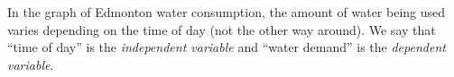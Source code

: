 \begin{boxedexplore}
\end{boxedexplore}

%
%

In the graph of Edmonton water consumption, the amount of water being used varies depending on the time of day (not the other way around). We say that ``time of day'' is the \textit{independent variable} and ``water demand'' is the \textit{dependent variable}. 

